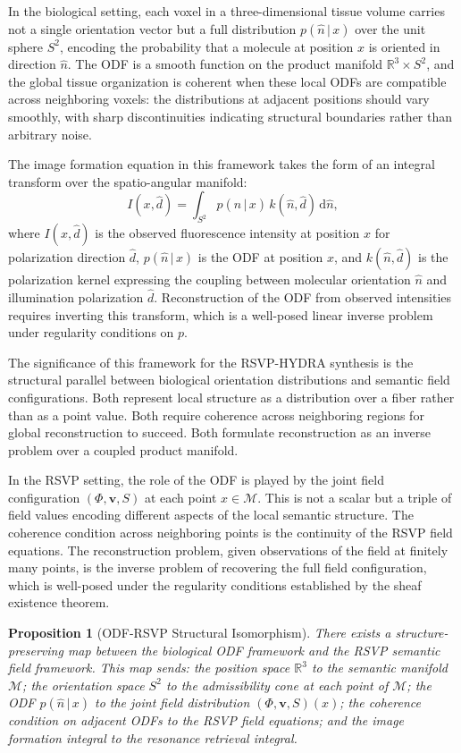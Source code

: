 \documentclass[12pt, a4paper, openany]{book}
\theoremstyle{plain}
\newtheorem{proposition}[theorem]{Proposition}
\theoremstyle{definition}
\theoremstyle{remark}
\newcommand{\vvec}{\mathbf{v}}
\newcommand{\Sfield}{S}
\begin{document}
In the biological setting, each voxel in a three-dimensional tissue volume carries not a single orientation vector but a full distribution $p(\hat{n}\,|\,x)$ over the unit sphere $S^2$, encoding the probability that a molecule at position $x$ is oriented in direction $\hat{n}$. The ODF is a smooth function on the product manifold $\mathbb{R}^3 \times S^2$, and the global tissue organization is coherent when these local ODFs are compatible across neighboring voxels: the distributions at adjacent positions should vary smoothly, with sharp discontinuities indicating structural boundaries rather than arbitrary noise.

The image formation equation in this framework takes the form of an integral transform over the spatio-angular manifold:
\[
I(x, \hat{d}) = \int_{S^2} p(\hat{n}\,|\,x)\, k(\hat{n}, \hat{d})\, \mathrm{d}\hat{n},
\]
where $I(x, \hat{d})$ is the observed fluorescence intensity at position $x$ for polarization direction $\hat{d}$, $p(\hat{n}\,|\,x)$ is the ODF at position $x$, and $k(\hat{n}, \hat{d})$ is the polarization kernel expressing the coupling between molecular orientation $\hat{n}$ and illumination polarization $\hat{d}$. Reconstruction of the ODF from observed intensities requires inverting this transform, which is a well-posed linear inverse problem under regularity conditions on $p$.

The significance of this framework for the RSVP-HYDRA synthesis is the structural parallel between biological orientation distributions and semantic field configurations. Both represent local structure as a distribution over a fiber rather than as a point value. Both require coherence across neighboring regions for global reconstruction to succeed. Both formulate reconstruction as an inverse problem over a coupled product manifold.

In the RSVP setting, the role of the ODF is played by the joint field configuration $(\Phi, \vvec, \Sfield)$ at each point $x \in \mathcal{M}$. This is not a scalar but a triple of field values encoding different aspects of the local semantic structure. The coherence condition across neighboring points is the continuity of the RSVP field equations. The reconstruction problem, given observations of the field at finitely many points, is the inverse problem of recovering the full field configuration, which is well-posed under the regularity conditions established by the sheaf existence theorem.

\begin{proposition}[ODF-RSVP Structural Isomorphism]
There exists a structure-preserving map between the biological ODF framework and the RSVP semantic field framework. This map sends: the position space $\mathbb{R}^3$ to the semantic manifold $\mathcal{M}$; the orientation space $S^2$ to the admissibility cone at each point of $\mathcal{M}$; the ODF $p(\hat{n}\,|\,x)$ to the joint field distribution $(\Phi, \vvec, \Sfield)(x)$; the coherence condition on adjacent ODFs to the RSVP field equations; and the image formation integral to the resonance retrieval integral.
\end{proposition}
\end{document}

